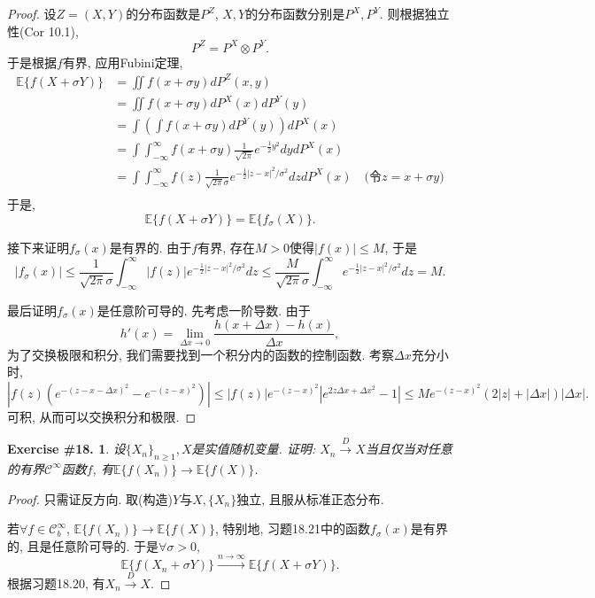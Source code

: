 \documentclass[UTF8, a4paper]{article}
\newtheorem{exercise}{Exercise \#18.}
\begin{document}
\begin{proof}
设\(Z = (X,Y)\)的分布函数是\(P^{Z}\), \(X,Y\)的分布函数分别是\(P^X, P^Y\).
则根据独立性(Cor 10.1), 
$$
P^{Z} = P^X \otimes P^Y.
$$
于是根据\(f\)有界, 应用Fubini定理,
$$
\begin{aligned}
    \mathbb{E}\{f(X+\sigma Y)\} &= \iint f(x+\sigma y) dP^{Z}(x,y) \\
    &= \iint f(x+\sigma y) dP^X(x) dP^Y(y) \\
    &= \int \left(\int f(x+\sigma y) dP^Y(y)\right) dP^X(x) \\
    &= \int \int_{-\infty}^{\infty} f(x+\sigma y) \frac{1}{\sqrt{2\pi}} e^{-\frac{1}{2}y^2} dy dP^X(x) \\
    &= \int \int_{-\infty}^{\infty} f(z) \frac{1}{\sqrt{2\pi}\sigma} e^{-\frac{1}{2}|z-x|^2/\sigma^2} dz dP^X(x) \quad \text{(令\(z = x + \sigma y\))} \\
\end{aligned}
$$
于是, 
$$
\mathbb{E}\{f(X+\sigma Y)\} = \mathbb{E}\{f_\sigma(X)\}.
$$

接下来证明\(f_\sigma(x)\)是有界的. 由于\(f\)有界, 存在\(M > 0\)使得\(|f(x)| \leq M\), 于是
$$
|f_\sigma(x)| \leq \frac{1}{\sqrt{2\pi}\sigma} \int_{-\infty}^{\infty} |f(z)| e^{-\frac{1}{2}|z-x|^2/\sigma^2} dz \leq \frac{M}{\sqrt{2\pi}\sigma} \int_{-\infty}^{\infty} e^{-\frac{1}{2}|z-x|^2/\sigma^2} dz = M.
$$

最后证明\(f_\sigma(x)\)是任意阶可导的. 
先考虑一阶导数.
由于 
$$
h'(x) = \lim_{\Delta x \to 0} \frac{h(x+\Delta x) - h(x)}{\Delta x},
$$
为了交换极限和积分, 我们需要找到一个积分内的函数的控制函数.
考察\(\Delta x\)充分小时, 
$$
\left|f(z) \left(e^{-(z - x - \Delta x)^2} - e^{-(z - x )^2}\right)\right| \leq |f(z)| e^{-(z - x)^2} |e^{2z\Delta x + \Delta x^2} - 1| \leq M e^{-(z - x)^2} (2|z| + |\Delta x|) |\Delta x|.
$$
可积, 从而可以交换积分和极限.
\end{proof}



\begin{framed}
\begin{exercise}
设\(\{X_n\}_{n\geq 1}, X\)是实值随机变量. 证明: \(X_n \xrightarrow{D}X\)当且仅当对任意的有界\(\mathcal{C}^\infty\)函数\(f\), 有\(\mathbb{E}\{f(X_n)\} \to \mathbb{E}\{f(X)\}\).
\end{exercise}
\end{framed}

\begin{proof}
只需证反方向. 取(构造)\(Y\)与\(X, \{X_n\}\)独立, 且服从标准正态分布.

若\(\forall f \in \mathscr{C}_b^\infty\), \(\mathbb{E}\{f(X_n)\} \to \mathbb{E}\{f(X)\}\),
特别地, 习题18.21中的函数\(f_\sigma(x)\)是有界的, 且是任意阶可导的.
于是\(\forall \sigma > 0\),
$$
\mathbb{E}\{f(X_n + \sigma Y)\} \xrightarrow{{n\to\infty}} \mathbb{E}\{f(X + \sigma Y)\}.
$$
根据习题18.20, 有\(X_n \xrightarrow{D}X\).
\end{proof}









\end{document}
